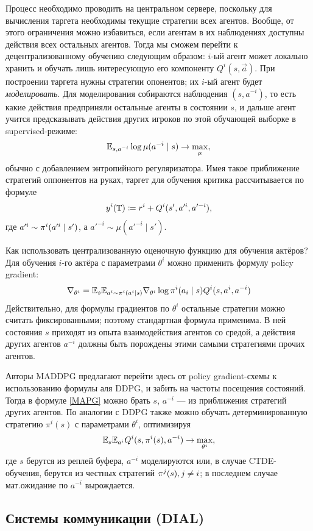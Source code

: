 Процесс необходимо проводить на центральном сервере, поскольку для вычисления таргета необходимы текущие стратегии всех агентов. Вообще, от этого ограничения можно избавиться, если агентам в их наблюдениях доступны действия всех остальных агентов. Тогда мы сможем перейти к децентрализованному обучению следующим образом: $i$-ый агент может локально хранить и обучать лишь интересующую его компоненту $Q^i(s, \vec{a})$. При построении таргета нужны стратегии опонентов; их $i$-ый агент будет \emph{моделировать}. Для моделирования собираются наблюдения $(s, a^{-i})$, то есть какие действия предприняли остальные агенты в состоянии $s$, и дальше агент учится предсказывать действия других игроков по этой обучающей выборке в supervised-режиме:
$$\mathbb{E}_{s, a^{-i}} \log \mu(a^{-i} \mid s) \to \max_{\mu},$$
обычно с добавлением энтропийного регуляризатора. Имея такое приближение стратегий оппонентов на руках, таргет для обучения критика рассчитывается по формуле
$$y^i(\mathbb{T}) \coloneqq r^i + Q^i(s', a'^i, a'^{-i}),$$
где $a'^i \HM\sim \pi^i(a'^i \mid s')$, а $a'^{-i} \sim \mu(a'^{-i} \mid s')$.

Как использовать централизованную оценочную функцию для обучения актёров? Для обучения $i$-го актёра с параметрами $\theta^i$ можно применить формулу policy gradient:
\begin{equation}\label{MAPG}
\nabla_{\theta^i} = \E_{s} \E_{a^i \sim \pi^i(a^i \mid s)} \nabla_{\theta^i} \log \pi^i(a_i \HM\mid s) Q^i(s, a^i, a^{-i})
\end{equation}
Действительно, для формулы градиентов по $\theta^i$ остальные стратегии можно считать фиксированными; поэтому стандартная формула применима. В ней состояния $s$ приходят из опыта взаимодействия агентов со средой, а действия других агентов $a^{-i}$ должны быть порождены этими самыми стратегиями прочих агентов. 

Авторы MADDPG предлагают перейти здесь от policy gradient-схемы к использованию формулы аля DDPG, и забить на частоты посещения состояний. Тогда в формуле \eqref{MAPG} можно брать $s$, $a^{-i}$ --- из приближения стратегий других агентов. По аналогии с DDPG также можно обучать детерминированную стратегию $\pi^i(s)$ с параметрами $\theta^i$, оптимизируя
$$\mathbb{E}_{s} \mathbb{E}_{a^i} Q^i(s, \pi^i(s), a^{-i}) \to \max_{\theta^i},$$
где $s$ берутся из реплей буфера, $a^{-i}$ моделируются или, в случае CTDE-обучения, берутся из честных стратегий $\pi^j(s), j \HM\ne i$; в последнем случае мат.ожидание по $a^{-i}$ вырождается.

\subsection{Системы коммуникации (DIAL)}

